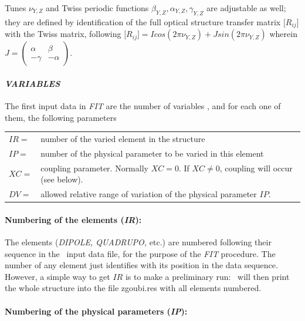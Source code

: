 Tunes $\nu_{Y,Z}$ and Twiss periodic functions $\beta_{Y,Z}, \alpha_{Y,Z}, \gamma_{Y,Z}$ are adjustable 
as well; they are defined by identification of the full optical structure transfer matrix  
$  \lbrack R_{ij}\rbrack $  with the Twiss matrix, following 
  $\lbrack R_{ij}\rbrack = I cos(2 \pi \nu_{Y,Z}) + J sin (2 \pi \nu_{Y,Z}) $ wherein 
$J=\left( \begin{array}{cc} \alpha & \beta \\ -\gamma& -\alpha \end{array} \right) $.  

\paragraph{\textit{VARIABLES}}

\noindent The first input data in \textsl{FIT} are the number of variables
\textsl{\NV}, and for each one of them, the following parameters  

\begin{tabular}{ll}
$ IR = $ &number of the varied element in the structure \\
$ IP =  $ &number of the physical parameter to be varied in this element \\
$ XC =  $ &coupling parameter. Normally $ XC=0$.  If $ XC\not= 0$, coupling will occur (see below).\\
$ DV = $ &allowed relative range of variation of the physical parameter $ IP $.
\end{tabular}

\paragraph{Numbering of the elements (\textsl{IR}): } 

\noindent The elements (\textsl{DIPOLE, QUADRUPO,} etc.) are numbered
following their sequence in the \zgou\ input data file, for the purpose of 
the \textsl{FIT} procedure. The number of any element just identifies with 
its position in the data sequence. However, a simple way to get $ IR $ is to make a preliminary run: \zgou\ will then
print the whole structure into the file  zgoubi.res with all elements numbered.  

\paragraph{Numbering of the physical parameters (\textsl{IP}): }

